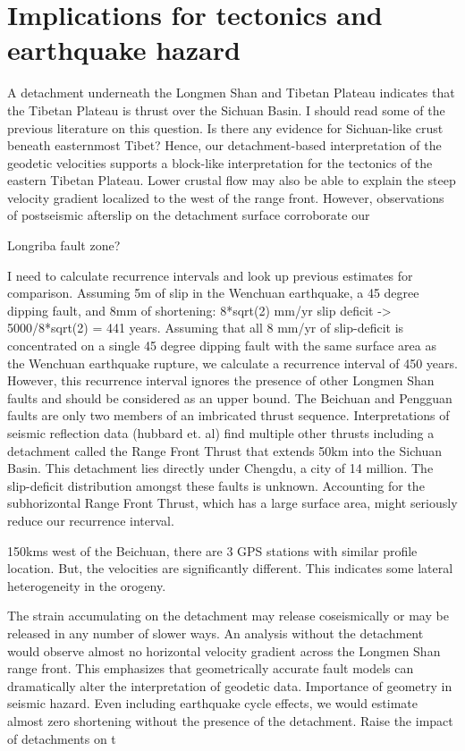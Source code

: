 \documentclass{article}
\begin{document}
\section{Implications for tectonics and earthquake hazard}
A detachment underneath the Longmen Shan and Tibetan Plateau indicates that the Tibetan Plateau is thrust over the Sichuan Basin. I should read some of the previous literature on this question. Is there any evidence for Sichuan-like crust beneath easternmost Tibet? 
Hence, our detachment-based interpretation of the geodetic velocities supports a block-like interpretation for the tectonics of the eastern Tibetan Plateau. Lower crustal flow may also be able to explain the steep velocity gradient localized to the west of the range front. However, observations of postseismic afterslip on the detachment surface corroborate our  

Longriba fault zone?

I need to calculate recurrence intervals and look up previous estimates for comparison. 
Assuming 5m of slip in the Wenchuan earthquake, a 45 degree dipping fault, and 8mm of shortening: 8*sqrt(2) mm/yr slip deficit -> 5000/8*sqrt(2) = 441 years.
Assuming that all 8 mm/yr of slip-deficit is concentrated on a single 45 degree dipping fault with the same surface area as the Wenchuan earthquake rupture, we calculate a recurrence interval of 450 years.
However, this recurrence interval ignores the presence of other Longmen Shan faults and should be considered as an upper bound. The Beichuan and Pengguan faults are only two members of an imbricated thrust sequence. Interpretations of seismic reflection data (hubbard et. al) find multiple other thrusts including a detachment called the Range Front Thrust that extends 50km into the Sichuan Basin. This detachment lies directly under Chengdu, a city of 14 million. The slip-deficit distribution amongst these faults is unknown. Accounting for the subhorizontal Range Front Thrust, which has a large surface area, might seriously reduce our recurrence interval.

150kms west of the Beichuan, there are 3 GPS stations with similar profile location. But, the velocities are significantly different. This indicates some lateral heterogeneity in the orogeny.

The strain accumulating on the detachment may release coseismically or may be released in any number of slower ways. 
An analysis without the detachment would observe almost no horizontal velocity gradient across the Longmen Shan range front. This emphasizes that geometrically accurate fault models can dramatically alter the interpretation of geodetic data. 
Importance of geometry in seismic hazard. Even including earthquake cycle effects, we would estimate almost zero shortening without the presence of the detachment. Raise the impact of detachments on t
\end{document}
